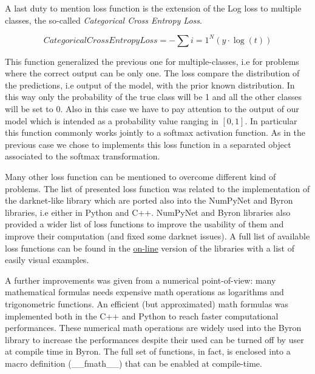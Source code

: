 \documentclass{standalone}
\begin{document}
A last duty to mention loss function is the extension of the Log loss to multiple classes, the so-called \emph{Categorical Cross Entropy Loss}.

$$
CategoricalCrossEntropyLoss = -\sum{i=1}^{N}\left( y\cdot\log(t) \right)
$$

This function generalized the previous one for multiple-classes, i.e for problems where the correct output can be only one.
The loss compare the distribution of the predictions, i.e output of the model, with the prior known distribution.
In this way only the probability of the true class will be 1 and all the other classes will be set to 0.
Also in this case we have to pay attention to the output of our model which is intended as a probability value ranging in $[0, 1]$.
In particular this function commonly works jointly to a softmax activation function.
As in the previous case we chose to implements this loss function in a separated object associated to the softmax transformation.

Many other loss function can be mentioned to overcome different kind of problems.
The list of presented loss function was related to the implementation of the \textsf{darknet}-like library which are ported also into the \textsf{NumPyNet} and \textsf{Byron} libraries, i.e either in \textsf{Python} and \textsf{C++}.
\textsf{NumPyNet} and \textsf{Byron} libraries also provided a wider list of loss functions to improve the usability of them and improve their computation (and fixed some \textsf{darknet} issues).
A full list of available loss functions can be found in the \href{https://github.com/Nico-Curti/Byron/blob/master/src/cost_layer.cpp}{on-line} version of the libraries with a list of easily visual examples.

A further improvements was given from a numerical point-of-view: many mathematical formulas needs expensive math operations as logarithms and trigonometric functions.
An efficient (but approximated) math formulas was implemented both in the \textsf{C++} and \textsf{Python} to reach faster computational performances.
These numerical math operations are widely used into the \textsf{Byron} library to increase the performances despite their used can be turned off by user at compile time in \textsf{Byron}.
The full set of functions, in fact, is enclosed into a \textsf{macro} definition (\textsf{\_\_fmath\_\_}) that can be enabled at compile-time.
\end{document}
